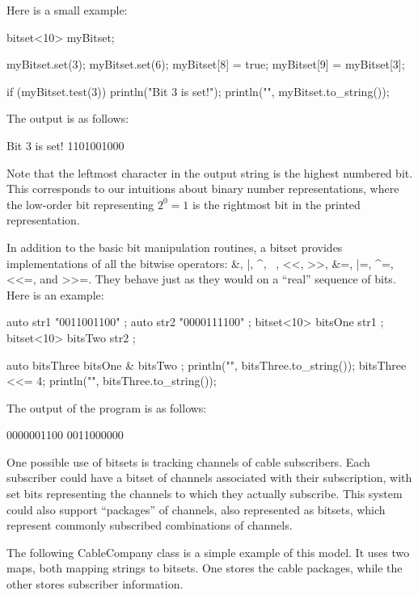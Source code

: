Here is a small example:

\begin{cpp}
bitset<10> myBitset;

myBitset.set(3);
myBitset.set(6);
myBitset[8] = true;
myBitset[9] = myBitset[3];

if (myBitset.test(3)) { println("Bit 3 is set!"); }
println("{}", myBitset.to_string());
\end{cpp}

The output is as follows:

\begin{shell}
Bit 3 is set!
1101001000
\end{shell}

Note that the leftmost character in the output string is the highest numbered bit. This corresponds to our intuitions about binary number representations, where the low-order bit representing $2^0 = 1$ is the rightmost bit in the printed representation.


In addition to the basic bit manipulation routines, a bitset provides implementations of all the bitwise operators: \&, |, \^{}, ~, <{}<, >{}>, \&=, |=, \^{}=, <{}<=, and >{}>=. They behave just as they would on a “real” sequence of bits. Here is an example:

\begin{cpp}
auto str1 { "0011001100" };
auto str2 { "0000111100" };
bitset<10> bitsOne { str1 };
bitset<10> bitsTwo { str2 };

auto bitsThree { bitsOne & bitsTwo };
println("{}", bitsThree.to_string());
bitsThree <<= 4;
println("{}", bitsThree.to_string());
\end{cpp}

The output of the program is as follows:

\begin{shell}
0000001100
0011000000
\end{shell}


One possible use of bitsets is tracking channels of cable subscribers. Each subscriber could have a bitset of channels associated with their subscription, with set bits representing the channels to which they actually subscribe. This system could also support “packages” of channels, also represented as bitsets, which represent commonly subscribed combinations of channels.

The following CableCompany class is a simple example of this model. It uses two maps, both mapping strings to bitsets. One stores the cable packages, while the other stores subscriber information.

